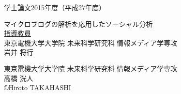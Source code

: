 \pagestyle{empty}
\begin{center}

\LARGE{学士論文\hspace{10mm}2015年度（平成27年度）}\\

\vspace{19mm}

\huge{マイクロブログの解析を応用したソーシャル分析}\\
\vspace{60mm}
\large{\underline{指導教員}}\\
\large{東京電機大学大学院 未来科学研究科 情報メディア学専攻}\\
\Large{岩井 将行}\\

\vspace{40mm}

\large{東京電機大学大学院 未来科学研究科 情報メディア学専攻}\\
\LARGE{高橋 洸人}\\
\large{\copyright Hiroto TAKAHASHI}\\
\end{center}
